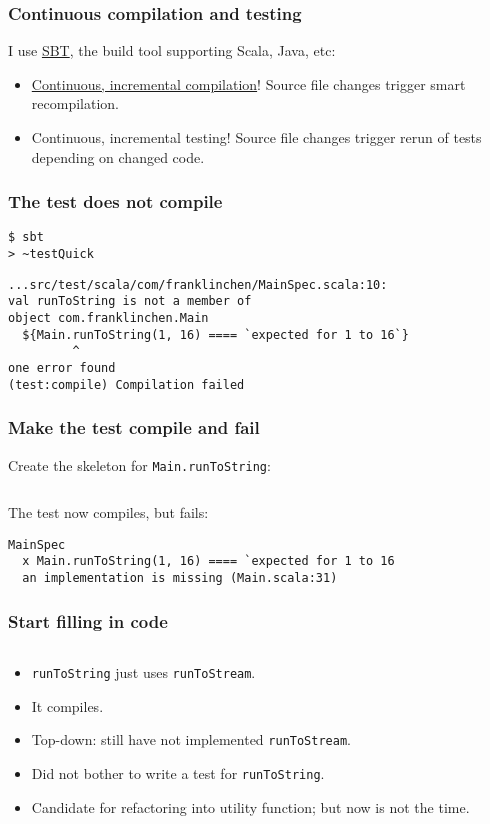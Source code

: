 \begin{frame}[fragile]
  \frametitle{Continuous compilation and testing}

  I use \href{http://www.scala-sbt.org/}{SBT}, the build tool supporting Scala, Java, etc:
  \begin{itemize}
  \item \href{http://www.scala-sbt.org/release/docs/Detailed-Topics/Triggered-Execution.html}{Continuous, incremental compilation}! Source file changes trigger smart recompilation.
  \item Continuous, incremental testing! Source file changes trigger rerun of tests depending on changed code.
  \end{itemize}
\end{frame}

\begin{frame}[fragile]
  \frametitle{The test does not compile}

  \begin{verbatim}
$ sbt
> ~testQuick
  \end{verbatim}

  \begin{verbatim}
...src/test/scala/com/franklinchen/MainSpec.scala:10:
val runToString is not a member of
object com.franklinchen.Main
  ${Main.runToString(1, 16) ==== `expected for 1 to 16`}
         ^
one error found
(test:compile) Compilation failed
  \end{verbatim}
\end{frame}

\begin{frame}[fragile]
  \frametitle{Make the test compile and fail}

  Create the skeleton for \texttt{Main.runToString}:
  \inputminted{scala}{Main2.scala}

  The test now compiles, but fails:
  \begin{verbatim}
MainSpec
  x Main.runToString(1, 16) ==== `expected for 1 to 16
  an implementation is missing (Main.scala:31)
  \end{verbatim}
\end{frame}

\begin{frame}[fragile]
  \frametitle{Start filling in code}

  \inputminted{scala}{Main3.scala}

  \begin{itemize}
  \item \texttt{runToString} just uses \texttt{runToStream}.
  \item It compiles.
  \item Top-down: still have not implemented \texttt{runToStream}.
  \item Did not bother to write a test for \texttt{runToString}.
  \item Candidate for refactoring into utility function; but now is not the time.
  \end{itemize}
\end{frame}

